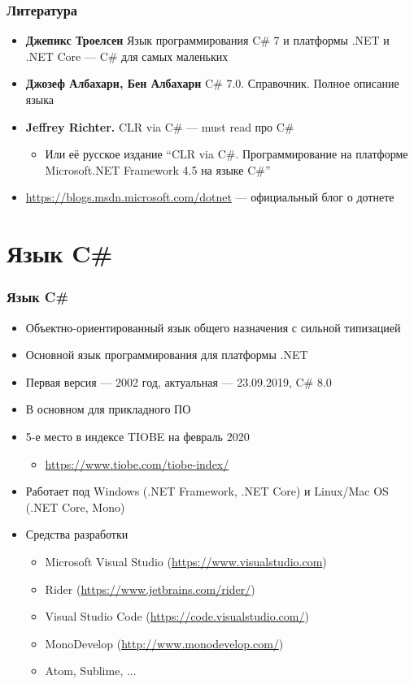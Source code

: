 \documentclass[xetex,mathserif,serif]{beamer}
\begin{document}
	\begin{frame}
	\frametitle{Литература}
		\begin{itemize}
			\item \textbf{Джепикс Троелсен} Язык программирования C\# 7 и платформы .NET и .NET Core --- C\# для самых маленьких
			\item \textbf{Джозеф Албахари, Бен Албахари} C\# 7.0. Справочник. Полное описание языка
			\item \textbf{Jeffrey Richter.} CLR via C\# --- must read про C\#
			\begin{itemize}
				\item Или её русское издание ``CLR via C\#. Программирование на платформе Microsoft.NET Framework 4.5 на языке C\#''
			\end{itemize}
			\item \url{https://blogs.msdn.microsoft.com/dotnet} --- официальный блог о дотнете
		\end{itemize}
	\end{frame}

	\section{Язык C\#}

	\begin{frame}
		\frametitle{Язык C\#}
		\begin{itemize}
			\item Объектно-ориентированный язык общего назначения с сильной типизацией
			\item Основной язык программирования для платформы .NET
			\item Первая версия --- 2002 год, актуальная --- 23.09.2019, C\# 8.0
			\item В основном для прикладного ПО
			\item 5-е место в индексе TIOBE на февраль 2020
			\begin{itemize}
				\item \url{https://www.tiobe.com/tiobe-index/}
			\end{itemize}
			\item Работает под Windows (.NET Framework, .NET Core) и Linux/Mac OS (.NET Core, Mono)
			\item Средства разработки
			\begin{itemize}
				\item Microsoft Visual Studio (\url{https://www.visualstudio.com})
				\item Rider (\url{https://www.jetbrains.com/rider/})
				\item Visual Studio Code (\url{https://code.visualstudio.com/})
				\item MonoDevelop (\url{http://www.monodevelop.com/})
				\item Atom, Sublime, ...
			\end{itemize}
		\end{itemize}
	\end{frame}
\end{document}
